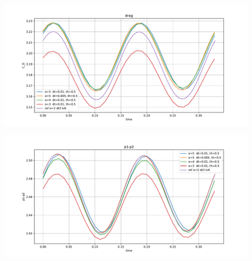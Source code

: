\documentclass[11pt]{article}
\begin{document}
\includegraphics[width=0.75\columnwidth]{drag_final}

\includegraphics[width=0.75\columnwidth]{p1p2_final}



\newpage


\end{document}
